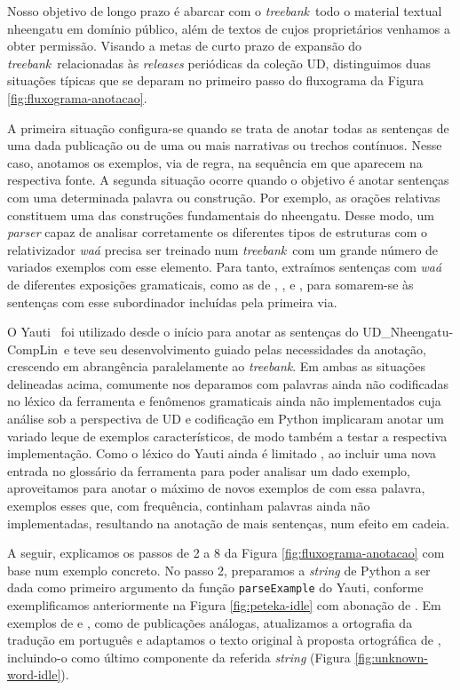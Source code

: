 \documentclass[portuguese]{textolivre}
\newcommand{\udc}{coleção UD}
\newcommand{\tbc}{UD\_Nheengatu-CompLin}
\newcommand{\tb}{\textit{treebank}}
\newcommand{\pvtres}{\parencite{alencar2023-yauti}}
\begin{document}
Nosso objetivo de longo prazo é abarcar com o \tb~todo o material textual nheengatu em domínio público, além de textos de cujos proprietários venhamos a obter permissão. Visando a metas de curto prazo de expansão do \tb~relacionadas às \textit{releases} periódicas da \udc, distinguimos duas situações típicas que se deparam no primeiro passo do fluxograma da Figura \ref{fig:fluxograma-anotacao}.

A primeira situação configura-se quando se trata de anotar todas as sentenças de uma dada publicação ou de uma ou mais narrativas ou trechos contínuos. Nesse caso, anotamos os exemplos, via de regra, na sequência em que aparecem na respectiva fonte. A segunda situação ocorre quando o objetivo é anotar sentenças com uma determinada palavra ou construção. Por exemplo, as orações relativas constituem uma das construções fundamentais do nheengatu. Desse modo, um \textit{parser} capaz de analisar corretamente os diferentes tipos de estruturas com o relativizador \textit{waá} precisa ser treinado num \tb~com um grande número de variados exemplos com esse elemento. Para tanto, extraímos sentenças com \textit{waá} de diferentes exposições gramaticais, como as de \textcite{seixas1853}, \textcite{magalhaes1876}, \textcite{sympson1877} e \textcite{casasnovas2006}, para somarem-se às sentenças com esse subordinador incluídas pela primeira via.

O Yauti \pvtres~foi utilizado desde o início para anotar as sentenças do \tbc~e teve seu desenvolvimento guiado pelas necessidades da anotação, crescendo em abrangência paralelamente ao \tb. Em ambas as situações delineadas acima, comumente nos deparamos com palavras ainda não codificadas no léxico da ferramenta e fenômenos gramaticais ainda não implementados cuja análise sob a perspectiva de UD e codificação em Python implicaram anotar um variado leque de exemplos característicos, de modo também a testar a respectiva implementação. Como o léxico do Yauti ainda é limitado \pvtres, ao incluir uma nova entrada no glossário da ferramenta para poder analisar um dado exemplo, aproveitamos para anotar o máximo de novos exemplos de \textcite{avila2021} com essa palavra, exemplos esses que, com frequência, continham palavras ainda não implementadas, resultando na anotação de mais sentenças, num efeito em cadeia.

A seguir, explicamos os passos de 2 a 8 da Figura \ref{fig:fluxograma-anotacao} com base num exemplo concreto. No passo 2, preparamos a \textit{string} de Python a ser dada como primeiro argumento da função \texttt{parseExample} do Yauti, conforme exemplificamos anteriormente na Figura \ref{fig:peteka-idle} com abonação de \textcite{avila2021}. Em exemplos de \textcite{magalhaes1876} e \textcite{sympson1877}, como de publicações análogas, atualizamos a ortografia da tradução em português e adaptamos o texto original à proposta ortográfica de \textcite{avila2021}, incluindo-o como último componente da referida \textit{string} (Figura \ref{fig:unknown-word-idle}). 
\end{document}
